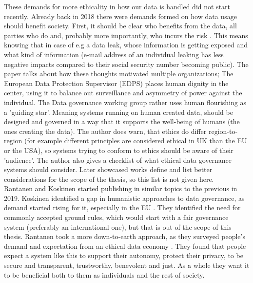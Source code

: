 \documentclass[english, 12pt, a4paper, sci, utf8, a-2b, online]{aaltothesis}
\theoremstyle{change}
\theoremstyle{theoremstyle}
\begin{document}
These demands for more ethicality in how our data is handled did not start recently. Already back in 2018 there were demands formed on how data usage should benefit society. First, it should be clear who benefits from the data, all parties who do and, probably more importantly, who incurs the risk \cite{hand2018aspects}. This means knowing that in case of e.g a data leak, whose information is getting exposed and what kind of information (e-mail address of an individual leaking has less negative impacts compared to their social security number becoming public). The paper talks about how these thoughts motivated multiple organizations; The European Data Protection Supervisor (EDPS) places human dignity in the center, using it to balance out surveillance and asymmetry of power against the individual. The Data governance working group rather uses human flourishing as a 'guiding star'.  Meaning systems running on human created data, should be designed and governed in a way that it supports the well-being of humans (the ones creating the data). The author does warn, that ethics do differ region-to-region (for example different principles are considered ethical in UK than the EU  or the USA), so systems trying to conform to ethics should be aware of their 'audience'. The author also gives a checklist of what ethical data governance systems should consider. Later showcased works define and list better considerations for the scope of the thesis, so this list is not given here.\\
Rantanen and Koskinen started publishing in similar topics to the previous in 2019. Koskinen identified a gap in humanistic approaches to data governance, as demand started rising for it, especially in the EU \cite{koskinen2019if}. They identified the need for commonly accepted ground rules, which would start with a fair governance system (preferably an international one), but that is out of the scope of this thesis. Rantanen took a more down-to-earth approach, as they surveyed people's demand and expectation from an ethical data economy \cite{rantanen2019towards}. They found that people expect a system like this to support their autonomy, protect their privacy, to be secure and transparent, trustworthy, benevolent and just. As a whole they want it to be beneficial both to them as individuals and the rest of society.
\end{document}
